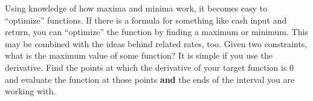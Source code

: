 \documentclass[../revisedmain.tex]{subfiles}
\begin{document}
	Using knowledge of how maxima and minima work, it becomes easy to ``optimize'' functions. If there is a formula for something like cash input and return, you can ``optimize'' the function by finding a maximum or minimum. This may be combined with the ideas behind related rates, too. Given two constraints, what is the maximum value of some function? It is simple if you use the derivative. Find the points at which the derivative of your target function is 0 and evaluate the function at those points \textbf{and} the ends of the interval you are working with.
\end{document}
